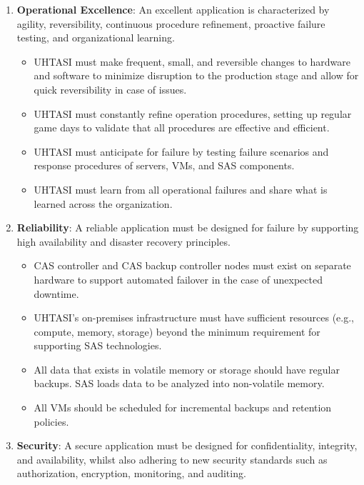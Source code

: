 \begin{enumerate}
    \item \textbf{\textcolor{Tue-link}{Operational Excellence}}: An excellent application is characterized by agility, reversibility, continuous procedure refinement, proactive failure testing, and organizational learning.
    \begin{itemize}
        \item UHTASI must make frequent, small, and reversible changes to hardware and software to minimize disruption to the production stage and allow for quick reversibility in case of issues.
        \item UHTASI must constantly refine operation procedures, setting up regular game days to validate that all procedures are effective and efficient. 
        \item UHTASI must anticipate for failure by testing failure scenarios and response procedures of servers, VMs, and SAS components.
        \item UHTASI must learn from all operational failures and share what is learned across the organization.
    \end{itemize}
    \item \textbf{\textcolor{Tue-link}{Reliability}}: A reliable application must be designed for failure by supporting high availability and disaster recovery principles. 
    \begin{itemize}
        \item CAS controller and CAS backup controller nodes must exist on separate hardware to support automated failover in the case of unexpected downtime. 
        \item UHTASI's on-premises infrastructure must have sufficient resources (e.g., compute, memory, storage) beyond the minimum requirement for supporting SAS technologies.
        \item All data that exists in volatile memory or storage should have regular backups. SAS loads data to be analyzed into non-volatile memory.
        \item All VMs should be scheduled for incremental backups and retention policies. 
    \end{itemize}
    \item \textbf{\textcolor{Tue-link}{Security}}: A secure application must be designed for confidentiality, integrity, and availability, whilst also adhering to new security standards such as authorization, encryption, monitoring, and auditing.
    \begin{itemize}

\end{itemize}
\end{enumerate}

